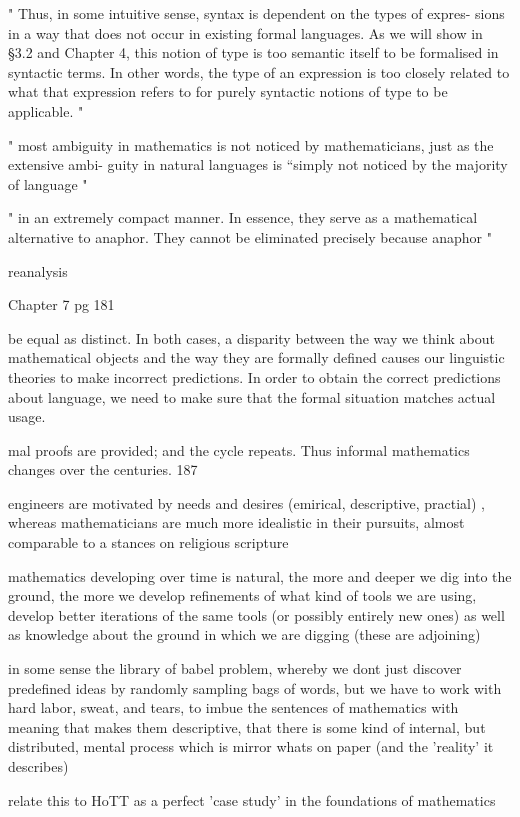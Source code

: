 "
Thus, in some intuitive sense, syntax is dependent on the types of expres-
sions in a way that does not occur in existing formal languages. As we will
show in §3.2 and Chapter 4, this notion of type is too semantic itself to be
formalised in syntactic terms. In other words, the type of an expression is too
closely related to what that expression refers to for purely syntactic notions
of type to be applicable.
"

"
most ambiguity in mathematics is not noticed by mathematicians, just as the extensive ambi-
guity in natural languages is “simply not noticed by the majority of language
"

"
in an extremely compact manner. In essence, they serve as a mathematical
alternative to anaphor. They cannot be eliminated precisely because anaphor
"

reanalysis

Chapter 7 pg 181

be equal as distinct. In both cases, a disparity between the way we think
about mathematical objects and the way they are formally defined causes
our linguistic theories to make incorrect predictions. In order to obtain the
correct predictions about language, we need to make sure that the formal
situation matches actual usage.

mal proofs are provided; and the cycle repeats. Thus informal mathematics
changes over the centuries. 187

engineers are motivated by needs and desires (emirical, descriptive,
practial) , whereas mathematicians are much more idealistic in their pursuits,
almost comparable to a stances on religious scripture

mathematics developing over time is natural, the more and deeper we dig into the
ground, the more we develop refinements of what kind of tools we are using,
develop better iterations of the same tools (or possibly entirely new ones) as
well as knowledge about the ground in which we are digging (these are adjoining)

in some sense the library of babel problem, whereby we dont just discover
predefined ideas by randomly sampling bags of words, but we have to work with
hard labor, sweat, and tears, to imbue the sentences of mathematics with meaning
that makes them descriptive, that there is some kind of internal, but
distributed, mental process which is mirror whats on paper (and the 'reality' it
describes)

relate this to HoTT as a perfect 'case study' in the foundations of mathematics


